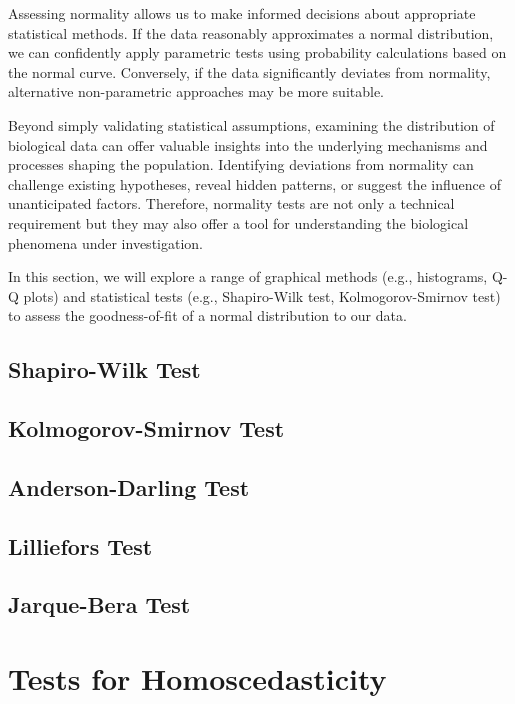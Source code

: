 \documentclass[
  letterpaper,
]{book}
\begin{document}
Assessing normality allows us to make informed decisions about
appropriate statistical methods. If the data reasonably approximates a
normal distribution, we can confidently apply parametric tests using
probability calculations based on the normal curve. Conversely, if the
data significantly deviates from normality, alternative non-parametric
approaches may be more suitable.

Beyond simply validating statistical assumptions, examining the
distribution of biological data can offer valuable insights into the
underlying mechanisms and processes shaping the population. Identifying
deviations from normality can challenge existing hypotheses, reveal
hidden patterns, or suggest the influence of unanticipated factors.
Therefore, normality tests are not only a technical requirement but they
may also offer a tool for understanding the biological phenomena under
investigation.

In this section, we will explore a range of graphical methods (e.g.,
histograms, Q-Q plots) and statistical tests (e.g., Shapiro-Wilk test,
Kolmogorov-Smirnov test) to assess the goodness-of-fit of a normal
distribution to our data.

\subsection{Shapiro-Wilk Test}\label{shapiro-wilk-test}

\subsection{Kolmogorov-Smirnov Test}\label{kolmogorov-smirnov-test}

\subsection{Anderson-Darling Test}\label{anderson-darling-test}

\subsection{Lilliefors Test}\label{lilliefors-test}

\subsection{Jarque-Bera Test}\label{jarque-bera-test}

\section{Tests for Homoscedasticity}\label{tests-for-homoscedasticity}
\end{document}
